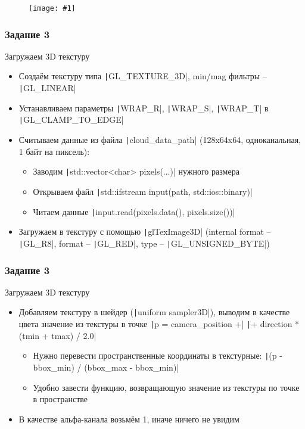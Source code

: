 \documentclass[10pt]{beamer}
\newcommand{\slideimage}[1]{
  \begin{figure}
    \begin{adjustbox}{width=\textwidth, totalheight=\textheight-2\baselineskip-2\baselineskip,keepaspectratio}
      \texttt{[image: \#1]}
    \end{adjustbox}
  \end{figure}
}
\begin{document}
\begin{frame}[fragile]
\slideimage{2.png}
\end{frame}

\begin{frame}[fragile]
\frametitle{Задание 3}
Загружаем 3D текстуру
\begin{itemize}
\item Создаём текстуру типа \texttt|GL_TEXTURE_3D|, min/mag фильтры -- \texttt|GL_LINEAR|
\item Устанавливаем параметры \texttt|WRAP_R|, \texttt|WRAP_S|, \texttt|WRAP_T| в \texttt|GL_CLAMP_TO_EDGE|
\item Считываем данные из файла \texttt|cloud_data_path| (128x64x64, одноканальная, 1 байт на пиксель):
\begin{itemize}
\item Заводим \texttt|std::vector<char> pixels(...)| нужного размера
\item Открываем файл \texttt|std::ifstream input(path, std::ios::binary)|
\item Читаем данные \texttt|input.read(pixels.data(), pixels.size())|
\end{itemize}
\item Загружаем в текстуру с помощью \texttt|glTexImage3D| (internal format -- \texttt|GL_R8|, format -- \texttt|GL_RED|, type -- \texttt|GL_UNSIGNED_BYTE|)
\end{itemize}
\end{frame}

\begin{frame}[fragile]
\frametitle{Задание 3}
Загружаем 3D текстуру
\begin{itemize}
\item Добавляем текстуру в шейдер (\texttt|uniform sampler3D|), выводим в качестве цвета значение из текстуры в точке \texttt|p = camera_position +|
\texttt|+ direction * (tmin + tmax) / 2.0|
\begin{itemize}
\item Нужно перевести пространственные координаты в текстурные: \texttt|(p - bbox_min) / (bbox_max - bbox_min)|
\item Удобно завести функцию, возвращающую значение из текстуры по точке в пространстве
\end{itemize}
\item В качестве альфа-канала возьмём 1, иначе ничего не увидим
\end{itemize}
\end{frame}
\end{document}
